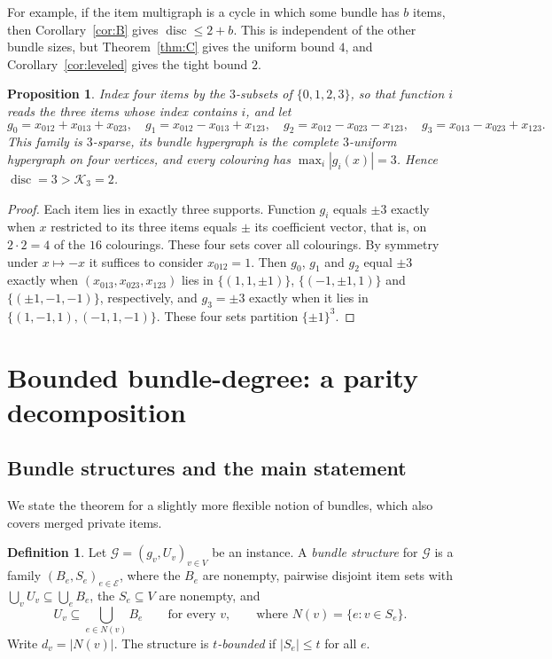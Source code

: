 \documentclass[11pt,letterpaper]{article}
\newtheorem{proposition}[theorem]{Proposition}
\theoremstyle{definition}
\newtheorem{definition}[theorem]{Definition}
\newcommand{\cG}{\mathcal{G}}
\newcommand{\cE}{\mathcal{E}}
\newcommand{\cube}[1]{\{\pm1\}^{#1}}
\DeclareMathOperator{\disc}{disc}
\begin{document}
For example, if the item multigraph is a cycle in which some bundle has $b$ items, then
Corollary~\ref{cor:B} gives $\disc\le2+b$. This is independent of the other bundle sizes, but
Theorem~\ref{thm:C} gives the uniform bound $4$, and Corollary~\ref{cor:leveled} gives the tight bound $2$.

\begin{proposition}\label{prop:t3}
Index four items by the $3$-subsets of $\{0,1,2,3\}$, so that function $i$ reads the three items
whose index contains $i$, and let
\[
  g_0=x_{012}+x_{013}+x_{023},\quad g_1=x_{012}-x_{013}+x_{123},\quad g_2=x_{012}-x_{023}-x_{123},\quad
  g_3=x_{013}-x_{023}+x_{123}.
\]
This family is $3$-sparse, its bundle hypergraph is the complete $3$-uniform hypergraph on four
vertices, and every colouring has $\max_i|g_i(x)|=3$. Hence $\disc=3>\mathcal{K}_3=2$.
\end{proposition}

\begin{proof}
Each item lies in exactly three supports. Function $g_i$ equals $\pm3$ exactly when $x$ restricted
to its three items equals $\pm$ its coefficient vector, that is, on $2\cdot2=4$ of the $16$
colourings. These four sets cover all colourings. By symmetry under $x\mapsto-x$ it suffices to
consider $x_{012}=1$. Then $g_0$, $g_1$ and $g_2$ equal $\pm3$ exactly when
$(x_{013},x_{023},x_{123})$ lies in $\{(1,1,\pm1)\}$, $\{(-1,\pm1,1)\}$ and $\{(\pm1,-1,-1)\}$,
respectively, and $g_3=\pm3$ exactly when it lies in $\{(1,-1,1),(-1,1,-1)\}$. These four sets
partition $\cube3$.
\end{proof}

\section{Bounded bundle-degree: a parity decomposition}\label{sec:degree}

\subsection{Bundle structures and the main statement}

We state the theorem for a slightly more flexible notion of bundles, which also covers merged
private items.

\begin{definition}\label{def:bundlestructure}
Let $\cG=(g_v,U_v)_{v\in V}$ be an instance. A \emph{bundle structure} for $\cG$ is a family
$(B_e,S_e)_{e\in\cE}$, where the $B_e$ are nonempty, pairwise disjoint item sets with
$\bigcup_vU_v\subseteq\bigcup_eB_e$, the $S_e\subseteq V$ are nonempty, and
\[
  U_v\subseteq\textstyle\bigcup_{e\in N(v)}B_e\qquad\text{for every }v,\qquad\text{where } N(v)=\{e:v\in S_e\}.
\]
Write $d_v=|N(v)|$. The structure is \emph{$t$-bounded} if $|S_e|\le t$ for all $e$.
\end{definition}
\end{document}
